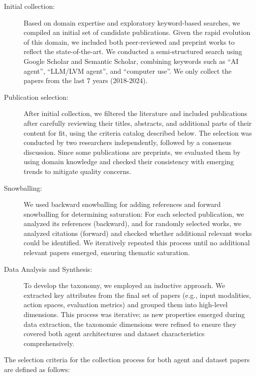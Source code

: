 \begin{description}
    \item[Initial collection:] Based on domain expertise and exploratory keyword-based searches, we compiled an initial set of candidate publications. Given the rapid evolution of this domain, we included both peer-reviewed and preprint works to reflect the state-of-the-art. 
    We conducted a semi-structured search using Google Scholar and Semantic Scholar, combining keywords such as ``AI agent'', ``LLM/LVM agent'', and ``computer use''. We only collect the papers from the last $7$ years (2018-2024).
    \item[Publication selection:] After initial collection, we filtered the literature and included publications after carefully reviewing their titles, abstracts, and additional parts of their content for fit, using the criteria catalog described below. The selection was conducted by two researchers independently, followed by a consensus discussion. Since some publications are preprints, we evaluated them by using domain knowledge and checked their consistency with emerging trends to mitigate quality concerns.
    \item[Snowballing:] We used backward snowballing for adding references and forward snowballing for determining saturation: For each selected publication, we analyzed its references (backward), and for randomly selected works, we analyzed citations (forward) and checked whether additional relevant works could be identified. We iteratively repeated this process until no additional relevant papers emerged, ensuring thematic saturation.
    \item[Data Analysis and Synthesis:] To develop the taxonomy, we employed an inductive approach. We extracted key attributes from the final set of papers (e.g., input modalities, action spaces, evaluation metrics) and grouped them into high-level dimensions. This process was iterative; as new properties emerged during data extraction, the taxonomic dimensions were refined to ensure they covered both agent architectures and dataset characteristics comprehensively.
\end{description}

The selection criteria for the collection process for both agent and dataset papers are defined as follows:



